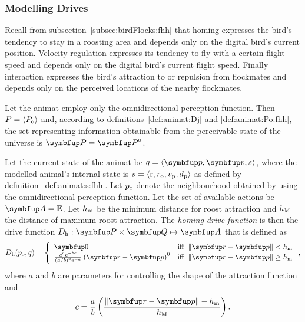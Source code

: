 \subsubsection{Modelling Drives}
Recall from subsection~\ref{subsec:birdFlocks:fhh} that homing expresses the bird's tendency to stay in a roosting area and depends only on the digital bird's current position. Velocity regulation expresses its tendency to fly with a certain flight speed and depends only on the digital bird's current flight speed. Finally interaction expresses the bird's attraction to or repulsion from flockmates and depends only on the perceived locations of the nearby flockmates. 

Let the animat employ only the omnidirectional perception function. Then $P=\langle P_\textnormal{o} \rangle$ and, according to definitions~\ref{def:animat:Dj} and \ref{def:animat:Po:fhh}, the set representing information obtainable from the perceivable state of the universe is $\set{P}=\set{P}^\textnormal{o}$.

\begin{definition}
	\label{def:animat:Dh:fhh}
	Let the current state of the animat be $q=\langle\vect{p},\vect{v},s\rangle$, where the modelled animal's internal state is $s=\langle\mathrm{r},r_\textnormal{o},v_\textnormal{p},d_\textnormal{p}\rangle$ as defined by definition~\ref{def:animat:s:fhh}. Let $p_\textnormal{o}$ denote the neighbourhood obtained by using the omnidirectional perception function. Let the set of available actions be $\set{A}=\E$. Let $h_\textnormal{m}$ be the minimum distance for roost attraction and $h_\textnormal{M}$ the distance of maximum roost attraction. The \emph{homing drive function} is then the drive function $D_\textnormal{h}: \set{P} \times \set{Q} \mapsto \set{A}$ that is defined as 
	\begin{equation}
		D_\textnormal{h}(p_\textnormal{o}, q) = \left\{
		\begin{array}{ll}
		\vect{0} & \mathrm{iff}\ \left\|\vect{r}-\vect{p}\right\| < h_\textnormal{m} \\
		\frac{c^a \mathrm{e}^{-bc}}{\left(a/b\right)^a \mathrm{e}^{-a}} \left(\vect{r}-\vect{p}\right)^0  & \mathrm{iff}\ \left\|\vect{r}-\vect{p}\right\| \geq h_\textnormal{m}
		\end{array}
		\right., \label{eq:animat:Dr:fhh}
	\end{equation}
	where $a$ and $b$ are parameters for controlling the shape of the attraction function and 
	\begin{equation}
		c=\frac{a}{b}\left(\frac{\left\|\vect{r}-\vect{p}\right\|-h_\textnormal{m}}{h_\textnormal{M}}\right).
	\end{equation}
\end{definition}


